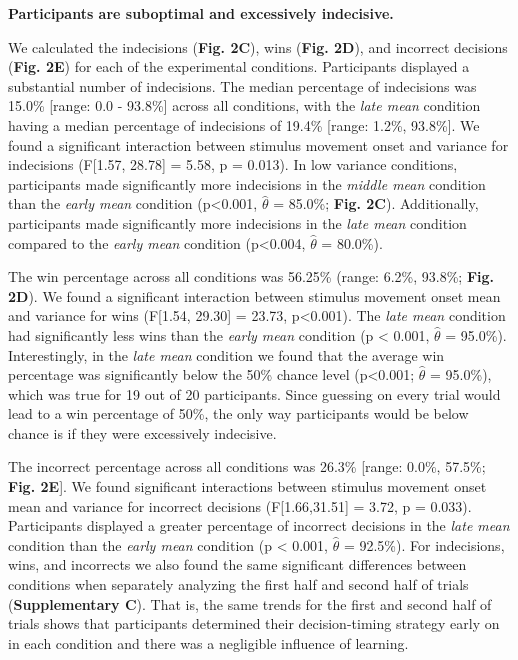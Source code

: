 \documentclass[12pt]{article}
\newcommand\boldblue[1]{\textcolor{mydarkblue}{\textbf{#1}}}
\begin{document}
\vspace*{2mm}
\noindent \boldblue{{{Participants are suboptimal and excessively indecisive.}}}

\noindent We calculated the indecisions (\boldblue{Fig. 2C}), wins (\boldblue{Fig. 2D}), and incorrect decisions (\boldblue{Fig. 2E}) for each of the experimental conditions. Participants displayed a substantial number of indecisions. The median percentage of indecisions was 15.0\% [range: 0.0 - 93.8\%] across all conditions, with the \emph{late mean} condition having a median percentage of indecisions of 19.4\% [range: 1.2\%, 93.8\%]. We found a significant interaction between stimulus movement onset and variance for indecisions (F[1.57, 28.78] = 5.58, p = 0.013). In low variance conditions, participants made significantly more indecisions in the \emph{middle mean} condition than the \emph{early mean} condition (p<0.001, $\hat{\theta}$ = 85.0\%; \boldblue{Fig. 2C}). Additionally, participants made significantly more indecisions in the \emph{late mean} condition compared to the \emph{early mean} condition (p<0.004, $\hat{\theta}$ = 80.0\%).

The win percentage across all conditions was 56.25\% (range: 6.2\%, 93.8\%; \boldblue{Fig. 2D}). We found a significant interaction between stimulus movement onset mean and variance for wins (F[1.54, 29.30] = 23.73, p<0.001). The \emph{late mean} condition had significantly less wins than the \emph{early mean} condition (p < 0.001, $\hat{\theta}$ = 95.0\%). Interestingly, in the \emph{late mean} condition we found that the average win percentage was significantly below the 50\% chance level (p<0.001; $\hat{\theta}$ = 95.0\%), which was true for 19 out of 20 participants. Since guessing on every trial would lead to a win percentage of 50\%, the only way participants would be below chance is if they were excessively indecisive.

The incorrect percentage across all conditions was 26.3\% [range: 0.0\%, 57.5\%; \boldblue{Fig. 2E}]. We found significant interactions between stimulus movement onset mean and variance for incorrect decisions (F[1.66,31.51] = 3.72, p = 0.033). Participants displayed a greater percentage of incorrect decisions in the \emph{late mean} condition than the \emph{early mean} condition (p < 0.001, $\hat{\theta}$ = 92.5\%). 
For indecisions, wins, and incorrects we also found the same significant differences between conditions when separately analyzing the first half and second half of trials (\boldblue{Supplementary C}). 
That is, the same trends for the first and second half of trials shows that participants determined their decision-timing strategy early on in each condition and there was a negligible influence of learning.
\end{document}

